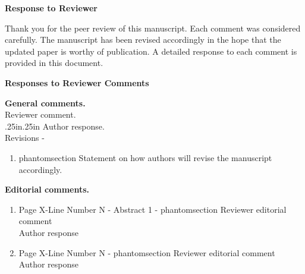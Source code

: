 \documentclass[11pt,a4paper]{article}
\makeatletter
\newcommand{\labeltext}[3][]{%
    \@bsphack%
    \csname phantomsection\endcsname %
    \def\tst{#1}%
    \def\labelmarkup{} %
    \def\refmarkup{}%
    \ifx\tst\empty\def\@currentlabel{\refmarkup{#2}}{\label{#3}}%
    \else\def\@currentlabel{\refmarkup{#1}}{\label{#3}}\fi%
    \@esphack%
    \labelmarkup{#2}%
}
\makeatother
\begin{document}
\begin{center}\textbf{Response to Reviewer}\end{center}

\noindent Thank you for the peer review of this manuscript. Each comment was considered carefully. The manuscript has been revised accordingly in the hope that the updated paper is worthy of publication. A detailed response to each comment is provided in this document. 

\begin{center}\textbf{Responses to Reviewer Comments}\end{center}

\relax {}\relax
\noindent\textbf{General comments.}\\
\noindent Reviewer comment.  \\ 

\leftskip.25in\relax \rightskip.25in\relax
\noindent Author response. \\

\noindent Revisions - 
\begin{enumerate}[leftmargin=.5in,rightmargin=.25in,topsep=0pt,itemsep=-1ex,partopsep=1ex,parsep=1ex]
    \item\labeltext{Statement on how authors will revise the manuscript accordingly.}{X-label-name}
\end{enumerate}
\vspace*{\baselineskip}



\newpage 

\relax {}\relax
\noindent\textbf{Editorial comments.}
\begin{enumerate}[leftmargin=*,topsep=0pt,itemsep=-1ex,partopsep=1ex,parsep=1ex]
    \item Page X-Line Number N - Abstract 1 - \labeltext{Reviewer editorial comment}{X-ed1}\\
        Author response 
        \vspace{.1in}
    \item Page X-Line Number N - \labeltext{Reviewer editorial comment}{X-ed2}\\
        Author response 
        \vspace{.1in}


\end{enumerate}
\end{document}
